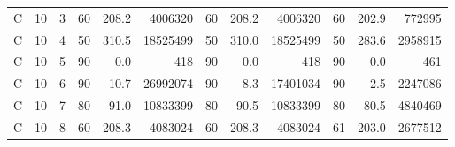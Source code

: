 \begin{table}[!h]
{\begin{tabular}{lrrrrrrrrrrr}
C & 10 & 3 & 60 & 208.2 & 4006320 & 60 & 208.2 & 4006320 & 60 & 202.9 & 772995\\
C & 10 & 4 & 50 & 310.5 & 18525499 & 50 & 310.0 & 18525499 & 50 & 283.6 & 2958915\\
C & 10 & 5 & 90 & 0.0 & 418 & 90 & 0.0 & 418 & 90 & 0.0 & 461\\
C & 10 & 6 & 90 & 10.7 & 26992074 & 90 & 8.3 & 17401034 & 90 & 2.5 & 2247086\\
C & 10 & 7 & 80 & 91.0 & 10833399 & 80 & 90.5 & 10833399 & 80 & 80.5 & 4840469\\
C & 10 & 8 & 60 & 208.3 & 4083024 & 60 & 208.3 & 4083024 & 61 & 203.0 & 2677512\\
\bottomrule
\end{tabular}}
\end{table}

